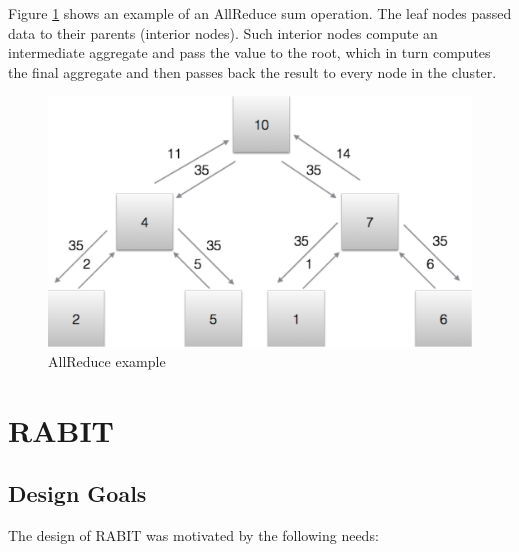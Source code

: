 \documentclass[10pt,twocolumn]{article}
\begin{document}
Figure \ref{allreduce} shows an example of an AllReduce sum operation. The leaf nodes passed data to their parents (interior nodes). Such interior nodes compute an intermediate aggregate and pass the value to the root, which in turn computes the final aggregate and then passes back the result to every node in the cluster.

\begin{figure}[tb]
\centering
\includegraphics[width=0.7\columnwidth]{fig/allreduce.pdf}
\caption{AllReduce example}
\label{allreduce}
\end{figure}


\section{RABIT}


\subsection{Design Goals}

The design of RABIT was motivated by the following needs:
\end{document}
